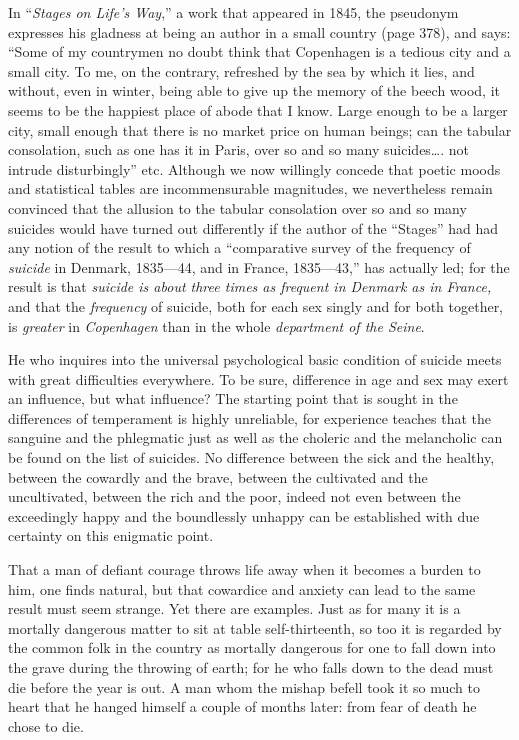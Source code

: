 \documentclass[12pt,a4paper,openany]{book}
\newcommand{\opage}[1]{\marginnote{\footnotesize\textit{[#1]}}}
\begin{document}
In ``\emph{Stages on Life's Way},'' a work that appeared in 1845, the pseudonym expresses his gladness at being an author in a small country (page 378), and says: ``Some of my countrymen no doubt think that Copenhagen is a tedious city and a small city. To me, on the contrary, refreshed by the sea by which it lies, and without, even in winter, being able to give up the memory of the beech wood, it seems to be the happiest place of abode that I know. Large enough to be a larger city, small enough that there is no market price on human beings; can the tabular consolation, such as one has it in Paris, over so and so many suicides\dots{}. not intrude disturbingly'' etc. Although we now willingly concede that poetic moods and statistical tables are
\setcounter{footnote}{0}%
\opage{692}incommensurable magnitudes, we nevertheless remain convinced that the allusion to the tabular consolation over so and so many suicides would have turned out differently if the author of the ``Stages'' had had any notion of the result to which a ``comparative survey of the frequency of \emph{suicide} in Denmark, 1835---44, and in France, 1835---43,'' has actually led; for the result is that \emph{suicide is about three times as frequent in Denmark as in France,} and that the \emph{frequency} of suicide, both for each sex singly and for both together, is \emph{greater} in \emph{Copenhagen} than in the whole \emph{department of the Seine}.

He who inquires into the universal psychological basic condition of suicide meets with great difficulties everywhere. To be sure, difference in age and sex may exert an influence, but what influence? The starting point that is sought in the differences of temperament is highly unreliable, for experience teaches that the sanguine and the phlegmatic just as well as the choleric and the melancholic can be found on the list of suicides. No difference between the sick and the healthy, between the cowardly and the brave, between the cultivated and the uncultivated, between the rich and the poor, indeed not even between the exceedingly happy and the boundlessly unhappy can be established with due certainty on this enigmatic point.

That a man of defiant courage throws life away when it becomes a burden to him, one finds natural, but that cowardice and anxiety can lead to the same result must seem strange. Yet there are examples. Just as for many it is a mortally dangerous matter to sit at table self-thirteenth, so too it is regarded by the common folk
\setcounter{footnote}{0}%
\opage{693}in the country as mortally dangerous for one to fall down into the grave during the throwing of earth; for he who falls down to the dead must die before the year is out. A man whom the mishap befell took it so much to heart that he hanged himself a couple of months later: from fear of death he chose to die.
\end{document}
